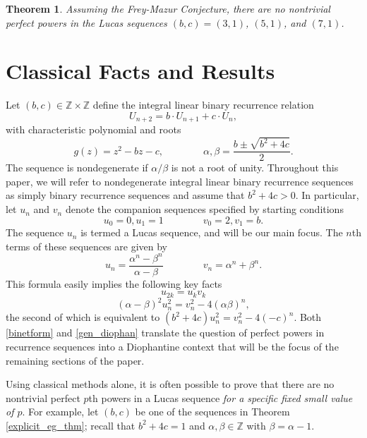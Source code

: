 \documentclass[12pt]{amsart}
\newtheorem{ithm}{Theorem}
\theoremstyle{definition}
\theoremstyle{remark}
\def\Z{{\mathbb Z}}
\begin{document}
\begin{ithm}\label{cond_examples}
Assuming the Frey-Mazur Conjecture, there are no nontrivial perfect powers in the Lucas sequences $(b,c) = (3,1)$, $(5,1)$, and $(7,1)$.
\end{ithm}

\section{Classical Facts and Results}\label{classicalresults}


Let $(b,c) \in \Z \times \Z$ define the integral linear binary recurrence relation
\[ U_{n+2} = b\cdot U_{n+1}+ c\cdot U_n, \]
with characteristic polynomial and roots
\[ g(z) = z^2 - bz - c, \qquad \qquad \alpha, \beta = \frac{b \pm \sqrt{b^2+4c}}{2}.\]
The sequence is nondegenerate if $\alpha/\beta$ is not a root of unity.  Throughout this paper, we will refer to nondegenerate integral linear binary recurrence sequences as simply binary recurrence sequences and assume that $b^2+4c >0$.  In particular, let $u_n$ and $v_n$ denote the companion sequences specified by starting conditions
\[ u_0 = 0, u_1 = 1 \qquad \qquad v_0 = 2, v_1 = b .\]
The sequence $u_n$ is termed a Lucas sequence, and will be our main focus.  The $n$th terms of these sequences are given by 
\begin{equation}\label{binetform} u_n = \frac{\alpha^n - \beta^n}{\alpha - \beta} \qquad \qquad v_n = \alpha^n +\beta^n. \end{equation}
This formula easily implies the following key facts
\begin{equation}\label{fib2} u_{2k} = u_kv_k \end{equation}
\begin{equation}\label{gen_diophan}(\alpha - \beta)^2u_n^2 = v_n^2 - 4(\alpha\beta)^n, \end{equation} the second of which is equivalent to $(b^2+4c)u_n^2 = v_n^2 - 4(-c)^n.$  Both \eqref{binetform} and \eqref{gen_diophan} translate the question of perfect powers in recurrence sequences into a Diophantine context that will be the focus of the remaining sections of the paper.


Using classical methods alone, it is often possible to prove that there are no nontrivial perfect $p$th powers in a Lucas sequence \emph{for a specific fixed small value of $p$}.  For example, let $(b,c)$ be one of the sequences in Theorem \ref{explicit_eg_thm}; recall that $b^2+4c = 1$ and $\alpha,\beta \in \Z$ with $\beta = \alpha-1$. 
\end{document}
